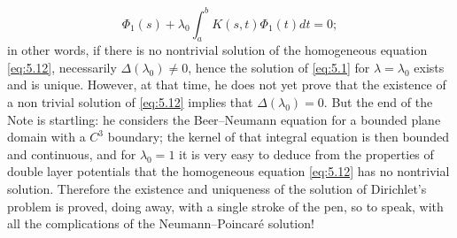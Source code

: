\documentclass[12pt,a4paper,leqno,twoside]{extbook}
\begin{document}
\begin{equation}
    \label{eq:5.12}
    \Phi_1(s) + \lambda_0 \int_a^b K(s, t) \Phi_1(t)dt = 0;
\end{equation}
in other words, if there is no nontrivial solution of the homogeneous equation \eqref{eq:5.12}, necessarily \(\Delta(\lambda_0) \neq 0\), hence the solution of \eqref{eq:5.1} for \(\lambda = \lambda_0\) exists and is unique. However, at that time, he does not yet prove that the existence of a non trivial solution of \eqref{eq:5.12} implies that \(\Delta(\lambda_0) = 0\). But the end of the Note is startling: he considers the Beer--Neumann equation for a bounded plane domain with a \(C^3\) boundary; the kernel of that integral equation is then bounded and continuous, and for \(\lambda_0 = 1\) it is very easy to deduce from the properties of double layer potentials that the homogeneous equation \eqref{eq:5.12} has no nontrivial solution. Therefore the existence and uniqueness of the solution of Dirichlet's problem is proved, doing away, with a single stroke of the pen, so to speak, with all the complications of the Neumann--Poincaré solution!
\end{document}

